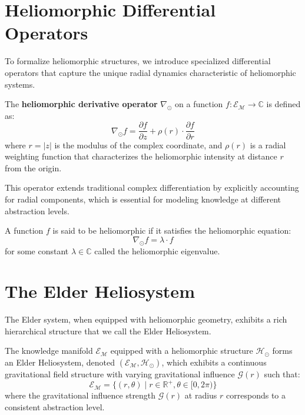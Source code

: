 \section{Heliomorphic Differential Operators}

To formalize heliomorphic structures, we introduce specialized differential operators that capture the unique radial dynamics characteristic of heliomorphic systems.

\begin{definition}
The \textbf{heliomorphic derivative operator} $\nabla_{\odot}$ on a function $f: \mathcal{E}_{\mathcal{M}} \rightarrow \mathbb{C}$ is defined as:
\begin{equation}
\nabla_{\odot} f = \frac{\partial f}{\partial z} + \rho(r) \cdot \frac{\partial f}{\partial r}
\end{equation}
where $r = |z|$ is the modulus of the complex coordinate, and $\rho(r)$ is a radial weighting function that characterizes the heliomorphic intensity at distance $r$ from the origin.
\end{definition}

This operator extends traditional complex differentiation by explicitly accounting for radial components, which is essential for modeling knowledge at different abstraction levels.

A function $f$ is said to be heliomorphic if it satisfies the heliomorphic equation:
\begin{equation}
\nabla_{\odot} f = \lambda \cdot f
\end{equation}
for some constant $\lambda \in \mathbb{C}$ called the heliomorphic eigenvalue.

\section{The Elder Heliosystem}

The Elder system, when equipped with heliomorphic geometry, exhibits a rich hierarchical structure that we call the Elder Heliosystem.

\begin{theorem}
The knowledge manifold $\mathcal{E}_{\mathcal{M}}$ equipped with a heliomorphic structure $\mathcal{H}_{\odot}$ forms an Elder Heliosystem, denoted $(\mathcal{E}_{\mathcal{M}}, \mathcal{H}_{\odot})$, which exhibits a continuous gravitational field structure with varying gravitational influence $\mathcal{G}(r)$ such that:
\begin{equation}
\mathcal{E}_{\mathcal{M}} = \{(r,\theta) \mid r \in \mathbb{R}^+, \theta \in [0, 2\pi)\}
\end{equation}
where the gravitational influence strength $\mathcal{G}(r)$ at radius $r$ corresponds to a consistent abstraction level.
\end{theorem}

